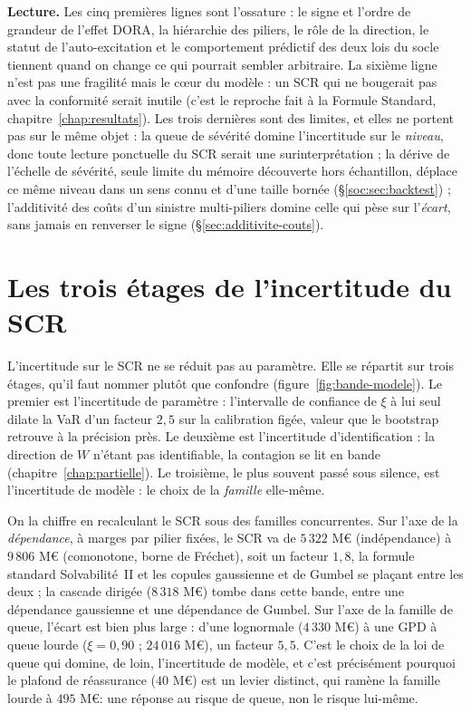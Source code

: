 \vspace{4pt}
\textbf{Lecture.} Les cinq premières lignes sont l'ossature : le signe et l'ordre
de grandeur de l'effet DORA, la hiérarchie des piliers, le rôle de la direction, le statut de
l'auto-excitation et le comportement prédictif des deux lois du socle tiennent quand on change ce
qui pourrait sembler arbitraire. La sixième ligne
n'est pas une fragilité mais le c\oe ur du modèle : un SCR qui ne bougerait pas avec la
conformité serait inutile (c'est le reproche fait à la Formule Standard,
chapitre~\ref{chap:resultats}). Les trois dernières sont des limites, et elles ne portent
pas sur le même objet : la queue de sévérité domine l'incertitude sur le \emph{niveau}, donc toute
lecture ponctuelle du SCR serait une surinterprétation ; la dérive de l'échelle de sévérité, seule
limite du mémoire découverte hors échantillon, déplace ce même niveau dans un sens connu et d'une
taille bornée (\S\ref{soc:sec:backtest}) ; l'additivité des coûts d'un sinistre
multi-piliers domine celle qui pèse sur l'\emph{écart}, sans jamais en renverser le signe
(\S\ref{sec:additivite-couts}).




\section{Les trois étages de l'incertitude du SCR}
\label{sec:trois-etages}

L'incertitude sur le SCR ne se réduit pas au paramètre. Elle se répartit sur trois étages, qu'il
faut nommer plutôt que confondre (figure~\ref{fig:bande-modele}). Le premier est l'incertitude
de paramètre : l'intervalle de confiance de $\xi$ à lui seul dilate la VaR d'un facteur
$2{,}5$ sur la calibration figée, valeur que le bootstrap retrouve à la précision près.
Le deuxième est l'incertitude d'identification :
la direction de $W$ n'étant pas identifiable, la contagion se lit en bande
(chapitre~\ref{chap:partielle}). Le troisième, le plus souvent passé sous silence, est
l'incertitude de modèle : le choix de la \emph{famille} elle-même.

On la chiffre en recalculant le SCR sous des familles concurrentes. Sur l'axe de la
\emph{dépendance}, à marges par pilier fixées, le SCR va de $5\,322$ M\euro{} (indépendance) à
$9\,806$ M\euro{} (comonotone, borne de Fréchet), soit un facteur $1{,}8$, la formule standard
Solvabilité~II et les copules gaussienne et de Gumbel se plaçant entre les deux ; la cascade
dirigée ($8\,318$ M\euro) tombe dans cette bande, entre une dépendance gaussienne et une
dépendance de Gumbel. Sur l'axe de la famille de queue, l'écart est bien plus large :
d'une lognormale ($4\,330$ M\euro) à une GPD à queue lourde ($\xi=0{,}90$ ; $24\,016$ M\euro),
un facteur $5{,}5$. C'est le choix de la loi de queue qui domine, de loin, l'incertitude de
modèle, et c'est précisément pourquoi le plafond de réassurance ($40$ M\euro) est un levier
distinct, qui ramène la famille lourde à $495$ M\euro : une réponse au risque de queue, non le
risque lui-même.

